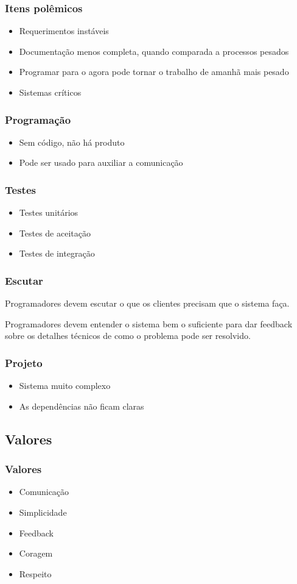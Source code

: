 \documentclass[10pt]{beamer}
\begin{document}
\begin{frame}
  \frametitle{Itens polêmicos}
  \begin{itemize}
  \item Requerimentos instáveis
  \item Documentação menos completa, quando comparada a processos pesados
  \item Programar para o agora pode tornar o trabalho de amanhã mais pesado
  \item Sistemas críticos
  \end{itemize}
\end{frame}

\begin{frame}
  \frametitle{Programação}
  \begin{itemize}
  \item Sem código, não há produto
  \item Pode ser usado para auxiliar a comunicação
  \end{itemize}
\end{frame}

\begin{frame}
  \frametitle{Testes}
  \begin{itemize}
  \item Testes unitários
  \item Testes de aceitação
  \item Testes de integração
  \end{itemize}
\end{frame}

\begin{frame}
  \frametitle{Escutar}
  Programadores devem escutar o que os clientes precisam que o sistema faça.

  \pause
  Programadores devem entender o sistema bem o suficiente para dar feedback
  sobre os detalhes técnicos de como o problema pode ser resolvido.
\end{frame}

\begin{frame}
  \frametitle{Projeto}
  \begin{itemize}
  \item Sistema muito complexo
  \item As dependências não ficam claras
  \end{itemize}
\end{frame}

\subsection{Valores}
\begin{frame}
  \frametitle{Valores}
  \begin{itemize}
  \item Comunicação
  \item Simplicidade
  \item Feedback
  \item Coragem
  \item Respeito
  \end{itemize}
\end{frame}
\end{document}
